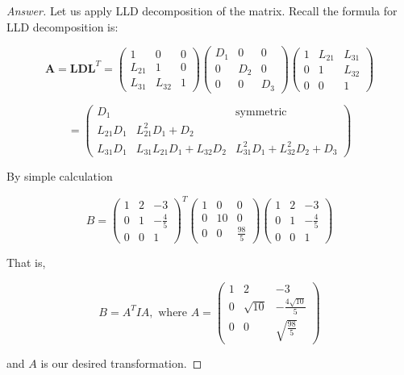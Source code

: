 \documentclass{article}
\theoremstyle{definition}
\theoremstyle{definition}
\theoremstyle{remark}
\begin{document}
\begin{proof}[Answer]
	Let us apply LLD decomposition of the matrix.	
	Recall the formula for LLD decomposition is:

	\[
\mathbf{A} = \mathbf{L} \mathbf{D} \mathbf{L}^T =
\begin{pmatrix}
1 & 0 & 0 \\
L_{21} & 1 & 0 \\
L_{31} & L_{32} & 1
\end{pmatrix}
\begin{pmatrix}
D_1 & 0 & 0 \\
0 & D_2 & 0 \\
0 & 0 & D_3
\end{pmatrix}
\begin{pmatrix}
1 & L_{21} & L_{31} \\
0 & 1 & L_{32} \\
0 & 0 & 1
\end{pmatrix}
\]

\[
=
\begin{pmatrix}
	D_1 &  & \text{symmetric} \\
L_{21} D_1 & L_{21}^2 D_1 + D_2 &  \\
L_{31} D_1 & L_{31} L_{21} D_1 + L_{32} D_2 & L_{31}^2 D_1 + L_{32}^2 D_2 + D_3
\end{pmatrix}
\]

By simple calculation 

\begin{equation}
	B = 
	\begin{pmatrix}
		1 & 2 & -3 \\  
		0 & 1 & -\frac{4}{5} \\ 
		0 & 0 & 1
	\end{pmatrix}^T
	\begin{pmatrix}
		1 & 0 & 0 \\  
		0 & 10 & 0 \\ 
		0 &  0 & \frac{98}{5}
	\end{pmatrix}
	\begin{pmatrix}
		1 & 2 & -3 \\  
		0 & 1 & -\frac{4}{5} \\ 
		0 & 0 & 1
	\end{pmatrix}
\end{equation}

That is, 

\begin{equation}
	B = A^T I A, \text{ where } A =
	\begin{pmatrix}
		1 & 2 & -3 \\  
		0 & \sqrt{10} & -\frac{4\sqrt{10}}{5} \\ 
		0 & 0 & \sqrt{\frac{98}{5}}
	\end{pmatrix}
\end{equation}

and $A$ is our desired transformation.

\end{proof}
\end{document}
